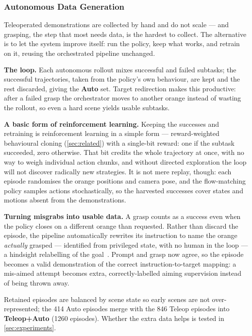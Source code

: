 \subsubsection{Autonomous Data Generation}
\label{subsec:autonomous}

Teleoperated demonstrations are collected by hand and do not scale --- and grasping, the step that most needs data, is the hardest to collect. The alternative is to let the system improve itself: run the policy, keep what works, and retrain on it, reusing the orchestrated pipeline unchanged.

\textbf{The loop.} Each autonomous rollout mixes successful and failed subtasks; the successful trajectories, taken from the policy's own behaviour, are kept and the rest discarded, giving the \textbf{Auto} set. Target redirection makes this productive: after a failed grasp the orchestrator moves to another orange instead of wasting the rollout, so even a hard scene yields usable subtasks.

\textbf{A basic form of reinforcement learning.} Keeping the successes and retraining is reinforcement learning in a simple form --- reward-weighted behavioural cloning (\cref{sec:related}) with a single-bit reward: one if the subtask succeeded, zero otherwise. That bit credits the whole trajectory at once, with no way to weigh individual action chunks, and without directed exploration the loop will not discover radically new strategies. It is not mere replay, though: each episode randomises the orange positions and camera pose, and the flow-matching policy samples actions stochastically, so the harvested successes cover states and motions absent from the demonstrations.

\textbf{Turning misgrabs into usable data.} A grasp counts as a success even when the policy closes on a different orange than requested. Rather than discard the episode, the pipeline automatically rewrites its instruction to name the orange \emph{actually} grasped --- identified from privileged state, with no human in the loop --- a hindsight relabelling of the goal~\cite{andrychowicz2017her}. Prompt and grasp now agree, so the episode becomes a valid demonstration of the correct instruction-to-target mapping: a mis-aimed attempt becomes extra, correctly-labelled aiming supervision instead of being thrown away.

Retained episodes are balanced by scene state so early scenes are not over-represented; the 414 Auto episodes merge with the 846 Teleop episodes into \textbf{Teleop+Auto} (1260 episodes). Whether the extra data helps is tested in \cref{sec:experiments}.

